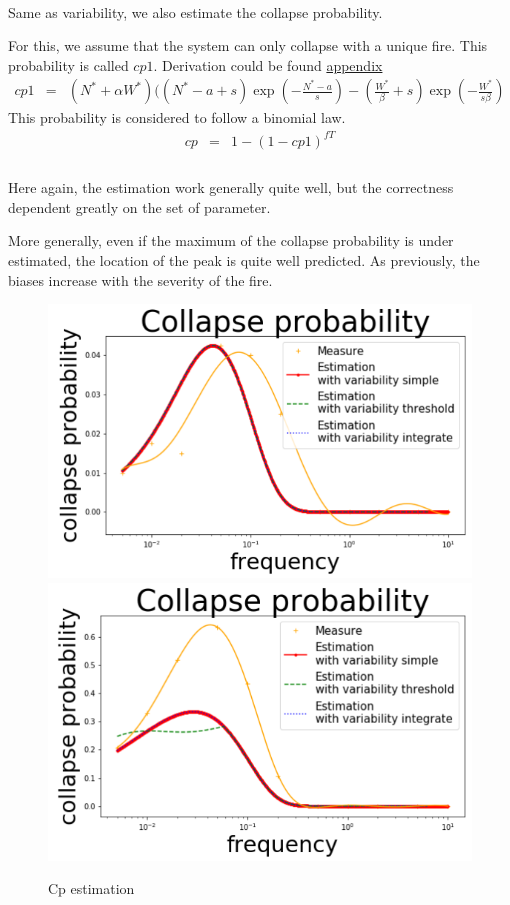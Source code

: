 \documentclass{article}
\begin{document}
\paragraph{}
Same as variability, we also estimate the collapse probability.

For this, we assume that the system can only collapse with a unique fire. This probability is called $cp1$. Derivation could be found \hyperref[cp_derivation]{appendix}
\[
\begin{array}{rcl}
cp1 & = & (N^*+\alpha W^*)((N^*-a+s)\exp(-\frac{N^*-a}{s}) - (\frac{W^*}{\beta}+s)\exp(-\frac{W^*}{s\beta})
\end{array}
\]
This probability is considered to follow a binomial law.
\[
\begin{array}{rcl}
cp & = & 1-(1-cp1)^{fT} \\
\end{array}
\]

\paragraph{}
Here again, the estimation work generally quite well, but the correctness dependent greatly on the set of parameter.

More generally, even if the maximum of the collapse probability is under estimated, the location of the peak is quite well predicted. As previously, the biases increase with the severity of the fire.


\begin{figure}[h!]
\centering
\includegraphics[width=6.cm]{cp.png}
\includegraphics[width=6.cm]{cp_threshold.png}
\caption{Cp estimation}
\end{figure}
\end{document}
